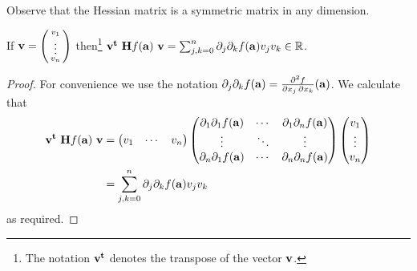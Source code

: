 Observe that the Hessian matrix is a symmetric matrix in any dimension.


\begin{lemma*}
    If \(\vv= \left( \begin{smallmatrix}
            v_1\\ \vdots \\v_n
        \end{smallmatrix} \right)  \) then\footnote{The notation \(\vv^{\mathbf{t}}\) denotes the transpose of the vector \(\vv\).} \(\vv^{\mathbf{t}} \ \mathbf{H} f (\aa) \ \vv = \sum_{j,k=0}^{n}
    \partial_{j}\partial_{k}f(\aa)
    v_j v_k \in \bR\).
\end{lemma*}

\begin{proof}
    For convenience we use the notation
    \(\partial_{j}\partial_{k}f(\aa) = \frac{\partial^2 f}{\partial x_j\,\partial x_k} (\aa)\).
    We calculate that
    \[
        \begin{aligned}
            \vv^{\mathbf{t}} \ \mathbf{H} f (\aa) \ \vv
             & =
            \begin{pmatrix}
                v_1 & \cdots & v_n
            \end{pmatrix}
            \begin{pmatrix}
                \partial_{1}\partial_{1}f(\aa) & \cdots &
                \partial_{1}\partial_{n}f(\aa)                   \\
                \vdots                         & \ddots & \vdots \\
                \partial_{n}\partial_{1}f(\aa) & \cdots &
                \partial_{n}\partial_{n}f(\aa)
            \end{pmatrix}
            \begin{pmatrix}
                v_1 \\ \vdots \\v_n
            \end{pmatrix}    \\
             & = \sum_{j,k=0}^{n}
            \partial_{j}\partial_{k}f(\aa)
            v_j v_k
        \end{aligned}
    \]
    as required.
\end{proof}


